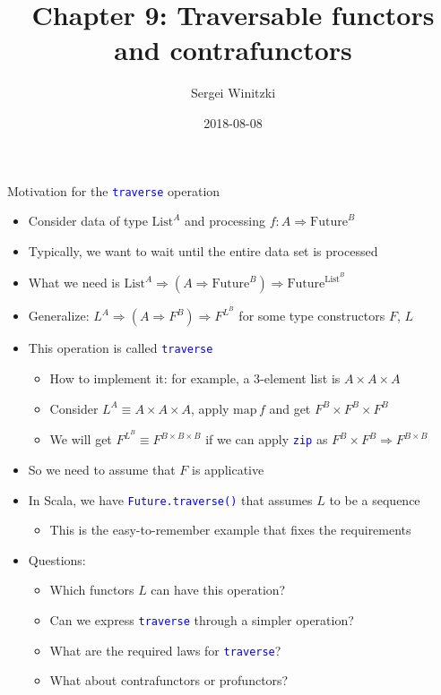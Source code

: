 \documentclass[english]{beamer}
\title[Chapter 9: Traversable (contra)functors]{Chapter 9: Traversable functors and contrafunctors}
\author{Sergei Winitzki}
\date{2018-08-08}
\institute[ABTB]{Academy by the Bay}
\begin{document}
\frame{\titlepage}
\begin{frame}{Motivation for the \texttt{\textcolor{blue}{\footnotesize{}traverse}}
operation}
\begin{itemize}
\item Consider data of type $\text{List}^{A}$ and processing $f:A\Rightarrow\text{Future}^{B}$
\item Typically, we want to wait until the entire data set is processed
\item What we need is $\text{List}^{A}\Rightarrow\left(A\Rightarrow\text{Future}^{B}\right)\Rightarrow\text{Future}^{\text{List}^{B}}$
\item Generalize: $L^{A}\Rightarrow\left(A\Rightarrow F^{B}\right)\Rightarrow F^{L^{B}}$
for some type constructors $F$, $L$
\item This operation is called \texttt{\textcolor{blue}{\footnotesize{}traverse}} 
\begin{itemize}
\item How to implement it: for example, a 3-element list is $A\times A\times A$
\item Consider $L^{A}\equiv A\times A\times A$, apply $\text{map}\,f$
and get $F^{B}\times F^{B}\times F^{B}$
\item We will get $F^{L^{B}}\equiv F^{B\times B\times B}$ if we can apply
\texttt{\textcolor{blue}{\footnotesize{}zip}} as $F^{B}\times F^{B}\Rightarrow F^{B\times B}$
\end{itemize}
\item So we need to assume that $F$ is applicative
\item In Scala, we have \texttt{\textcolor{blue}{\footnotesize{}Future.traverse()}}
that assumes $L$ to be a sequence
\begin{itemize}
\item This is the easy-to-remember example that fixes the requirements
\end{itemize}
\item Questions:
\begin{itemize}
\item Which functors $L$ can have this operation?
\item Can we express \texttt{\textcolor{blue}{\footnotesize{}traverse}}
through a simpler operation?
\item What are the required laws for \texttt{\textcolor{blue}{\footnotesize{}traverse}}?
\item What about contrafunctors or profunctors?
\end{itemize}
\end{itemize}
\end{frame}
\end{document}
